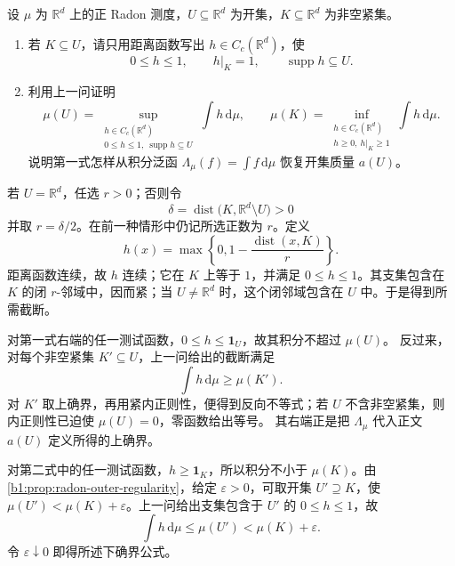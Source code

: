 \begin{exercise}\label{b1:ex:11-euclidean-testing}
设 \(\mu\) 为 \(\mathbb R^d\) 上的正 Radon 测度，\(U\subseteq\mathbb R^d\) 为开集，\(K\subseteq\mathbb R^d\) 为非空紧集。
\begin{enumerate}
\item\label{b1:item:11-euclidean-cutoff}
若 \(K\subseteq U\)，请只用距离函数写出 \(h\in C_c(\mathbb R^d)\)，使
\[
 0\leq h\leq1,\qquad h|_K=1,\qquad \operatorname{supp}h\subseteq U.
\]
\item\label{b1:item:11-euclidean-tests}
利用上一问证明
\[
 \mu(U)=\sup_{\substack{h\in C_c(\mathbb R^d)\\0\leq h\leq1,\ \operatorname{supp}h\subseteq U}}
              \int h\,\mathrm d\mu,
 \qquad
 \mu(K)=\inf_{\substack{h\in C_c(\mathbb R^d)\\h\geq0,\ h|_K\geq1}}
              \int h\,\mathrm d\mu.
\]
说明第一式怎样从积分泛函 \(\Lambda_\mu(f)=\int f\,\mathrm d\mu\) 恢复开集质量 \(a(U)\)。
\end{enumerate}
\end{exercise}
\begin{solution}
若 \(U=\mathbb R^d\)，任选 \(r>0\)；否则令
\[
 \delta=\operatorname{dist}\bigl(K,\mathbb R^d\setminus U\bigr)>0
\]
并取 \(r=\delta/2\)。在前一种情形中仍记所选正数为 \(r\)。定义
\[
 h(x)=\max\left\{0,1-\frac{\operatorname{dist}(x,K)}{r}\right\}.
\]
距离函数连续，故 \(h\) 连续；它在 \(K\) 上等于 \(1\)，并满足 \(0\leq h\leq1\)。其支集包含在 \(K\) 的闭 \(r\)-邻域中，因而紧；当 \(U\ne\mathbb R^d\) 时，这个闭邻域包含在 \(U\) 中。于是得到所需截断。

对第一式右端的任一测试函数，\(0\leq h\leq\mathbf1_U\)，故其积分不超过 \(\mu(U)\)。
反过来，对每个非空紧集 \(K'\subseteq U\)，上一问给出的截断满足
\[
 \int h\,\mathrm d\mu\geq\mu(K').
\]
对 \(K'\) 取上确界，再用紧内正则性，便得到反向不等式；若 \(U\) 不含非空紧集，则内正则性已迫使 \(\mu(U)=0\)，零函数给出等号。
其右端正是把 \(\Lambda_\mu\) 代入正文 \(a(U)\) 定义所得的上确界。

对第二式中的任一测试函数，\(h\geq\mathbf1_K\)，所以积分不小于 \(\mu(K)\)。由\cref{b1:prop:radon-outer-regularity}，给定 \(\varepsilon>0\)，可取开集 \(U'\supseteq K\)，使 \(\mu(U')<\mu(K)+\varepsilon\)。上一问给出支集包含于 \(U'\) 的 \(0\leq h\leq1\)，故
\[
 \int h\,\mathrm d\mu\leq\mu(U')<\mu(K)+\varepsilon.
\]
令 \(\varepsilon\downarrow0\) 即得所述下确界公式。
\end{solution}

